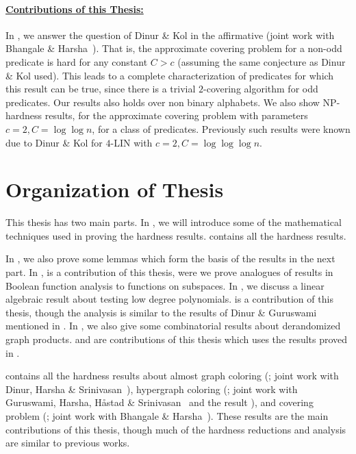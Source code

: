\noindent
\paragraph{\underline{Contributions of this Thesis:}}
In , we answer the question of Dinur \& Kol in the affirmative 
(joint work with Bhangale \& Harsha~\cite{BhangaleHV2014}). That is,
the approximate covering problem for a non-odd predicate is hard for any constant $C>c$ 
(assuming the same conjecture as Dinur \& Kol used). 
This leads to a complete characterization of predicates for which this result can be true,
since there is a trivial $2$-covering algorithm for odd predicates. 
Our results also holds over non binary alphabets. 
We also show NP-hardness results, for the approximate covering problem with parameters
$c=2, C = \log \log n$, for a class of predicates. Previously such results were  known due to
Dinur \& Kol  for $4$-LIN with $c=2,C= \log \log \log n$.




\section{Organization of Thesis} 

This thesis has two main parts. In
, we will introduce some of the mathematical techniques
used in proving the hardness results.  contains all the
hardness results.

In , we also prove some lemmas which form the
basis of the results in the next part. In , 
 is a contribution of this thesis, were we 
prove analogues of results in Boolean function analysis to functions
on subspaces. 
In , we discuss
a linear algebraic result about testing low degree polynomials.
 is a contribution of this thesis,
though the analysis is similar to the results of Dinur \&
Guruswami~\cite{DinurG2013} mentioned in . In
, we also give some combinatorial results about
derandomized graph products.  and
 are contributions of this thesis
which uses the results proved in .

 contains all the hardness results about almost graph 
coloring (; joint work with Dinur, Harsha \& Srinivasan~\cite{DinurHSV2014}), hypergraph coloring
(; joint work with Guruswami, Harsha, H\aa stad \& 
Srinivasan~\cite{GuruswamiHHSV2014} and the result \cite{Varma2014} ), and covering problem
(; joint work with Bhangale \& Harsha~\cite{BhangaleHV2014}). These results are the main contributions of
this thesis, though much of the hardness reductions and analysis are similar to
previous works.

